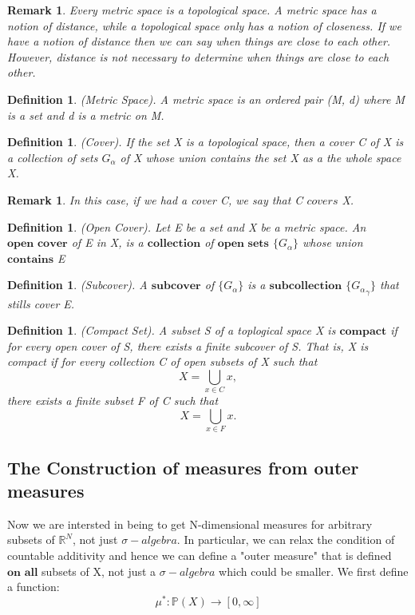 \documentclass[twoside]{article}
\newtheorem{remark}[theorem]{Remark}
\newtheorem{definition}[theorem]{Definition}
\newcommand{\sa}{\sigma-algebra}
\begin{document}
\begin{remark}
Every metric space is a topological space. A metric space has a notion of distance, while a topological space only has a notion of closeness. If we have a notion of distance then we can say when things are close to each other. However, distance is not necessary to determine when things are close to each other.
\end{remark}

\begin{definition}
(Metric Space). A metric space is an ordered pair (M, d) where M is a set and d is a metric on M.
\end{definition}

\begin{definition}
(Cover). If the set X is a topological space, then a cover C of X is a collection of sets $G_{\alpha}$ of X whose union contains the set X as a the whole space X.
\end{definition}

\begin{remark}
In this case, if we had a cover C, we say that C $\textit{covers}$ X.
\end{remark}

\begin{definition}
(Open Cover). Let E be a set and X be a metric space. An $\textbf{open cover}$ of E in X, is a $\textbf{collection}$ of $\textbf{open sets}$ $\{G_{\alpha}\}$ whose union $\textbf{contains}$ E
\end{definition}

\begin{definition}
(Subcover). A $\textbf{subcover}$ of $\{G_{\alpha}\}$ is a $\textbf{subcollection}$ $\{{G_\alpha}_{\gamma}\}$ that stills cover E.
\end{definition}

\begin{definition}
(Compact Set). A subset S of a toplogical space X is $\textbf{compact}$ if for every open cover of S, there exists a finite subcover of S. That is, X is compact if for every collection C of open subsets of X such that
$$
X = \bigcup_{x \in C}x,
$$
there exists a finite subset F of C such that
$$
X = \bigcup_{x \in F}x.
$$
\end{definition}

\subsection{The Construction of measures from outer measures}
Now we are intersted in being to get N-dimensional measures for arbitrary subsets of $\mathbb{R}^N$, not just $\sa$. In particular, we can relax the condition of countable additivity and hence we can define a "outer measure" that is defined $\textbf{on all}$ subsets of X, not just a $\sa$ which could be smaller. We first define a function:
$$
\mu^*: \mathbb{P}(X) \rightarrow [0, \infty]
$$
\end{document}
